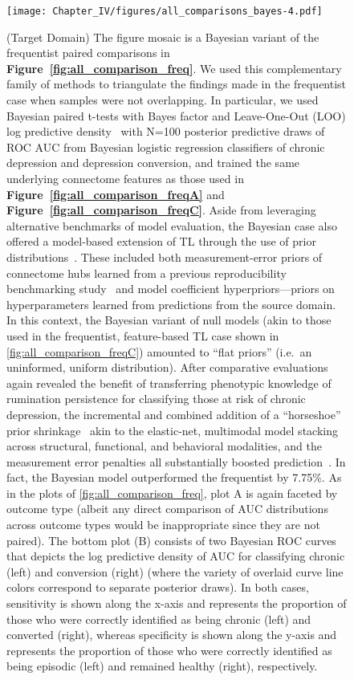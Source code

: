 \documentclass[
  notitlepage]{article}
\begin{document}
\begin{figure}
\centering
\texttt{[image: Chapter\_IV/figures/all\_comparisons\_bayes-4.pdf]}
\end{figure}
\begin{figure}
\ContinuedFloat
\centering
\caption{(Target Domain) \label{fig:all_comparisons_bayes}\scriptsize{The figure mosaic is a
Bayesian variant of the frequentist
paired comparisons in \textbf{Figure~\ref{fig:all_comparison_freq}}. We used this complementary family of methods to triangulate the findings made in the
frequentist case when samples were not overlapping. In particular, we used Bayesian paired 
t-tests with Bayes factor and Leave-One-Out (LOO) log
predictive density~\cite{Vehtari2016,Gelman2013} with
N=100 posterior predictive draws of ROC AUC from Bayesian logistic regression
classifiers of chronic depression and depression conversion, and trained the
same underlying connectome features as those used in \textbf{Figure~\ref{fig:all_comparison_freqA}} and \textbf{Figure~\ref{fig:all_comparison_freqC}}. Aside
from leveraging alternative benchmarks of model evaluation, the Bayesian
case also offered a model-based extension of TL through the use of prior
distributions~\cite{Chandra2020,Yang2020}. These included both measurement-error priors 
of connectome hubs learned from a previous reproducibility benchmarking
study~\cite{Pisner2021a} and model coefficient
hyperpriors---priors on hyperparameters learned from predictions from the source domain. 
In this context, the Bayesian variant of null models
(akin to those used in the frequentist, feature-based TL case shown in
\ref{fig:all_comparison_freqC}) amounted to ``flat priors'' (i.e.~an
uninformed, uniform distribution). After comparative evaluations again
revealed the benefit of transferring phenotypic knowledge of rumination
persistence for classifying those at risk of chronic depression, the
incremental and combined addition of a ``horseshoe'' prior
shrinkage~\cite{Carvalho2009} akin to the elastic-net,
multimodal model stacking~\cite{Yao2018} across
structural, functional, and behavioral modalities, and the measurement
error penalties all substantially boosted
prediction~\cite{Richardson1993}. In fact, the Bayesian
model outperformed the frequentist by 7.75\%. As in the plots of
\ref{fig:all_comparison_freq}, plot A is again faceted by outcome type
(albeit any direct comparison of AUC distributions across outcome types
would be inappropriate since they are not paired). The bottom plot (B)
consists of two Bayesian ROC curves that depicts the log predictive
density of AUC for classifying chronic (left) and conversion (right)
(where the variety of overlaid curve line colors correspond to separate
posterior draws). In both cases, sensitivity is shown along the x-axis
and represents the proportion of those who were correctly identified as
being chronic (left) and converted (right), whereas specificity is shown
along the y-axis and represents the proportion of those who were
correctly identified as being episodic (left) and remained healthy
(right), respectively.}}
\end{figure}
\setlength{\belowcaptionskip}{-10pt}
\end{document}
